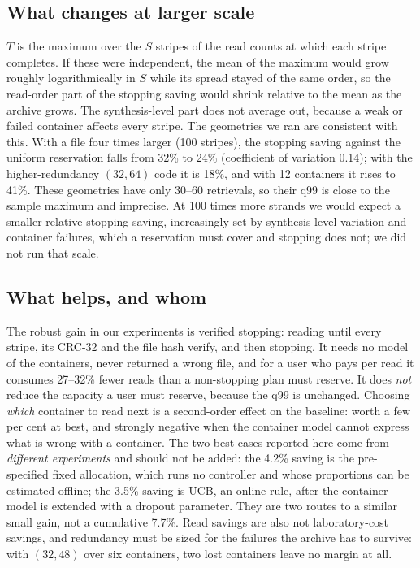 \documentclass[acmsmall,screen]{acmart}
\begin{document}
\subsection{What changes at larger scale}\label{sec:disc-scale}
$T$ is the maximum over the $S$ stripes of the read counts at which each stripe completes.  If these were
independent, the mean of the maximum would grow roughly logarithmically in $S$ while its spread stayed of
the same order, so the read-order part of the stopping saving would shrink relative to the mean as the
archive grows.  The synthesis-level part does not average out, because a weak or failed container affects
every stripe.  The geometries we ran are consistent with this.  With a file four times larger (100
stripes), the stopping saving against the uniform reservation falls from 32\% to 24\%
(coefficient of variation 0.14); with the higher-redundancy $(32,64)$ code it is 18\%,
and with 12 containers it rises to 41\%.  These geometries have only 30--60 retrievals, so
their q99 is close to the sample maximum and imprecise.  At 100 times more strands we would expect a
smaller relative stopping saving, increasingly set by synthesis-level variation and container failures,
which a reservation must cover and stopping does not; we did not run that scale.

\subsection{What helps, and whom}
The robust gain in our experiments is verified stopping: reading until every stripe, its CRC-32 and the
file hash verify, and then stopping.  It needs no model of the containers, never returned a wrong file,
and for a user who pays per read it consumes 27--32\% fewer reads than a non-stopping plan must reserve.
It does \emph{not} reduce the capacity a user must reserve, because the q99 is unchanged.  Choosing
\emph{which} container to read next is a second-order effect on the baseline: worth a few per cent at
best, and strongly negative when the container model cannot express what is wrong with a container.  The
two best cases reported here come from \emph{different experiments} and should not be added: the 4.2\%
saving is the pre-specified fixed allocation, which runs no controller and whose proportions can be
estimated offline; the 3.5\% saving is UCB, an online rule, after the container model is extended with a
dropout parameter.  They are two routes to a similar small gain, not a cumulative 7.7\%.  Read savings are
also not laboratory-cost savings, and redundancy must be sized for the failures the archive has to
survive: with $(32,48)$ over six containers, two lost containers leave no margin at all.
\end{document}
